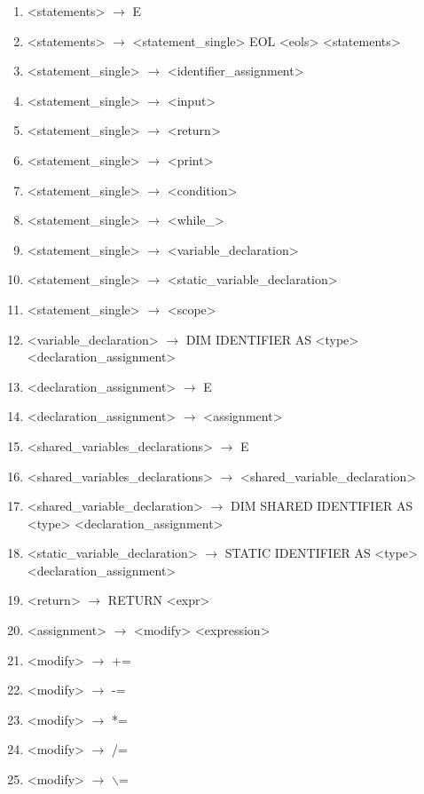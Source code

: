 \begin{normalsize}
\begin{enumerate}
\item <statements> $\rightarrow$ E
\item <statements> $\rightarrow$ <statement\_single> EOL <eols> <statements>


\item <statement\_single> $\rightarrow$ <identifier\_assignment>
\item <statement\_single> $\rightarrow$ <input>
\item <statement\_single> $\rightarrow$ <return>
\item <statement\_single> $\rightarrow$ <print>
\item <statement\_single> $\rightarrow$ <condition>
\item <statement\_single> $\rightarrow$ <while\_>
\item <statement\_single> $\rightarrow$ <variable\_declaration>
\item <statement\_single> $\rightarrow$ <static\_variable\_declaration>
\item <statement\_single> $\rightarrow$ <scope>

\item <variable\_declaration> $\rightarrow$ DIM IDENTIFIER AS <type> <declaration\_assignment>
\item <declaration\_assignment> $\rightarrow$ E
\item <declaration\_assignment> $\rightarrow$ <assignment>

\item <shared\_variables\_declarations> $\rightarrow$ E
\item <shared\_variables\_declarations> $\rightarrow$ <shared\_variable\_declaration>
\item <shared\_variable\_declaration> $\rightarrow$ DIM SHARED IDENTIFIER AS <type> <declaration\_assignment>

\item <static\_variable\_declaration> $\rightarrow$ STATIC IDENTIFIER AS <type> <declaration\_assignment>

\item <return> $\rightarrow$ RETURN <expr>

\item <assignment> $\rightarrow$ <modify> <expression>
\item <modify> $\rightarrow$ +=
\item <modify> $\rightarrow$ -=
\item <modify> $\rightarrow$ *=
\item <modify> $\rightarrow$ /=
\item <modify> $\rightarrow$ $\backslash$=


\end{enumerate}
\end{normalsize}
